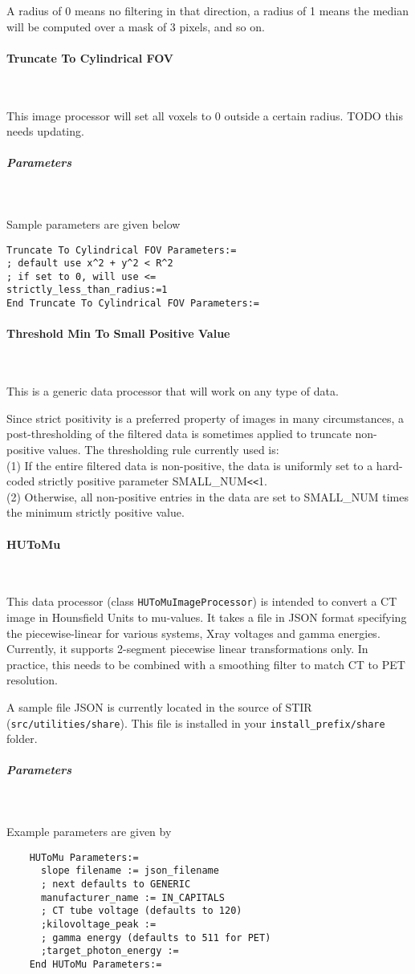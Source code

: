 \documentclass{article}
\newcommand{\tab}{\hspace{5mm}}
\newcommand{\subsubsubsection}[1]{\paragraph{#1}\mbox{} \\}
\newcommand{\subsubsubsubsection}[1]{\subparagraph{#1} \mbox{} \\}
\begin{document}
{{A radius of 0 means no filtering in that direction, a radius 
of 1 means the median will be computed over a mask of 3 pixels, 
and so on.


{ \subsubsubsection{Truncate To Cylindrical FOV}
}
This image processor will set all voxels to 0 outside a certain radius.
TODO this needs updating.
{ \subsubsubsubsection{Parameters}
}
Sample parameters are given below
\begin{verbatim}
Truncate To Cylindrical FOV Parameters:=
; default use x^2 + y^2 < R^2
; if set to 0, will use <=
strictly_less_than_radius:=1 
End Truncate To Cylindrical FOV Parameters:=
\end{verbatim}

{ \subsubsubsection{Threshold Min To Small Positive Value}
}
This is a generic data processor that will work on any type of data.

Since strict positivity is a preferred property of images in 
many circumstances, a post-thresholding of the filtered data 
is sometimes applied to truncate non-positive values. The thresholding 
rule currently used is:\\
(1)\tab 
If the entire filtered data is non-positive, the data is uniformly 
set to a hard-coded strictly positive parameter SMALL\_NUM\texttt{<}\texttt{<}1.\\
(2)\tab 
Otherwise, all non-positive entries in the data are set to SMALL\_NUM 
times the minimum strictly positive value.

{ \subsubsubsection{HUToMu}
}

This data processor (class \texttt{HUToMuImageProcessor}) is intended to convert a CT image in Hounsfield Units to mu-values.
It takes a file in JSON format specifying the piecewise-linear for various systems, Xray voltages and gamma energies.
Currently, it supports 2-segment piecewise linear transformations only.
In practice, this needs to be combined with a smoothing filter to match CT to PET resolution.

A sample file JSON is currently located in the source of STIR (\texttt{src/utilities/share}).
This file is installed in your \texttt{install\_prefix/share} folder.

{ \subsubsubsubsection{Parameters}
}
Example parameters are given by
\begin{verbatim}
    HUToMu Parameters:=
      slope filename := json_filename
      ; next defaults to GENERIC
      manufacturer_name := IN_CAPITALS
      ; CT tube voltage (defaults to 120)
      ;kilovoltage_peak :=
      ; gamma energy (defaults to 511 for PET)
      ;target_photon_energy :=
    End HUToMu Parameters:=
\end{verbatim}

}}
\end{document}
